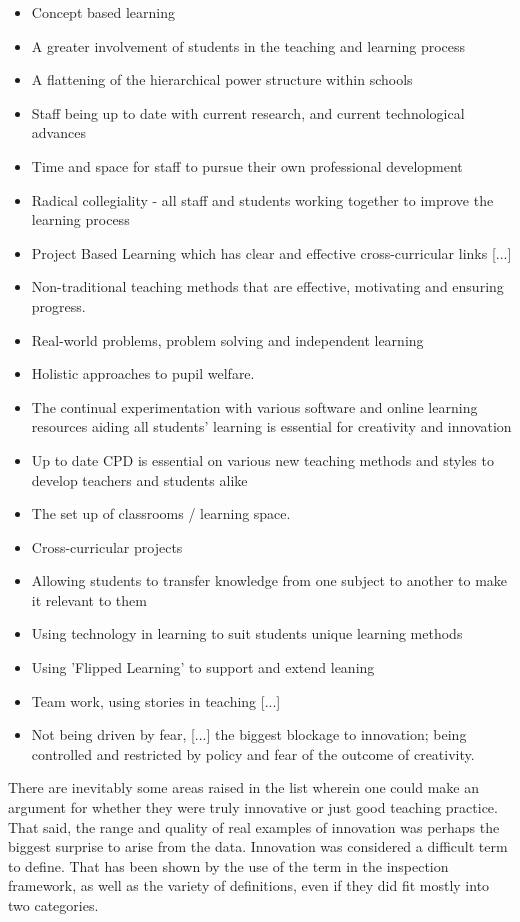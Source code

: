 \documentclass[11pt]{article}
\begin{document}
\begin{itemize}
	\item Concept based learning
	\item A greater involvement of students in the teaching and learning process
	\item A flattening of the hierarchical power structure within schools
	\item Staff being up to date with current research, and current technological advances
	\item Time and space for staff to pursue their own professional development
	\item Radical collegiality - all staff and students working together to improve the learning process
	\item Project Based Learning which has clear and effective cross-curricular links [...]
	\item Non-traditional teaching methods that are effective, motivating and ensuring progress.
	\item Real-world problems, problem solving and independent learning
	\item Holistic approaches to pupil welfare.
	\item The continual experimentation with various software and online learning resources aiding all students' learning is essential for creativity and innovation
	\item Up to date CPD is essential on various new teaching methods and styles to develop teachers and students alike
	\item The set up of classrooms / learning space.
	\item Cross-curricular projects
	\item Allowing students to transfer knowledge from one subject to another to make it relevant to them
	\item Using technology in learning to suit students unique learning methods
	\item Using 'Flipped Learning' to support and extend leaning
	\item Team work, using stories in teaching [...]
	\item Not being driven by fear, [...] the biggest blockage to innovation; being controlled and restricted by policy and fear of the outcome of creativity.
\end{itemize}

There are inevitably some areas raised in the list wherein one could make an argument for whether they were truly innovative or just good teaching practice. That said, the range and quality of real examples of innovation was perhaps the biggest surprise to arise from the data. Innovation was considered a difficult term to define. That has been shown by the use of the term in the inspection framework, as well as the variety of definitions, even if they did fit mostly into two categories. 
\end{document}
